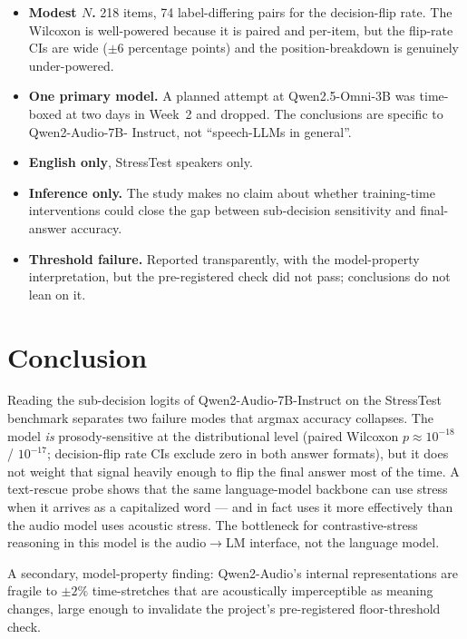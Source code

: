 \documentclass[11pt]{article}
\begin{document}
\begin{itemize}
    \item \textbf{Modest $N$.} 218 items, 74 label-differing
    pairs for the decision-flip rate. The Wilcoxon is well-powered
    because it is paired and per-item, but the flip-rate CIs are
    wide ($\pm 6$ percentage points) and the position-breakdown is
    genuinely under-powered.
    \item \textbf{One primary model.} A planned attempt at
    Qwen2.5-Omni-3B was time-boxed at two days in Week~2 and
    dropped. The conclusions are specific to Qwen2-Audio-7B-
    Instruct, not ``speech-LLMs in general''.
    \item \textbf{English only}, StressTest speakers only.
    \item \textbf{Inference only.} The study makes no claim about
    whether training-time interventions could close the gap
    between sub-decision sensitivity and final-answer accuracy.
    \item \textbf{Threshold failure.} Reported transparently, with
    the model-property interpretation, but the pre-registered
    check did not pass; conclusions do not lean on it.
\end{itemize}

\section{Conclusion}

Reading the sub-decision logits of Qwen2-Audio-7B-Instruct on the
StressTest benchmark separates two failure modes that argmax
accuracy collapses. The model \emph{is} prosody-sensitive at the
distributional level (paired Wilcoxon $p \approx 10^{-18}$ /
$10^{-17}$; decision-flip rate CIs exclude zero in both answer
formats), but it does not weight that signal heavily enough to
flip the final answer most of the time. A text-rescue probe shows
that the same language-model backbone can use stress when it
arrives as a capitalized word --- and in fact uses it more
effectively than the audio model uses acoustic stress. The
bottleneck for contrastive-stress reasoning in this model is the
audio$\rightarrow$LM interface, not the language model.

A secondary, model-property finding: Qwen2-Audio's internal
representations are fragile to $\pm 2\%$ time-stretches that are
acoustically imperceptible as meaning changes, large enough to
invalidate the project's pre-registered floor-threshold check.
\end{document}
